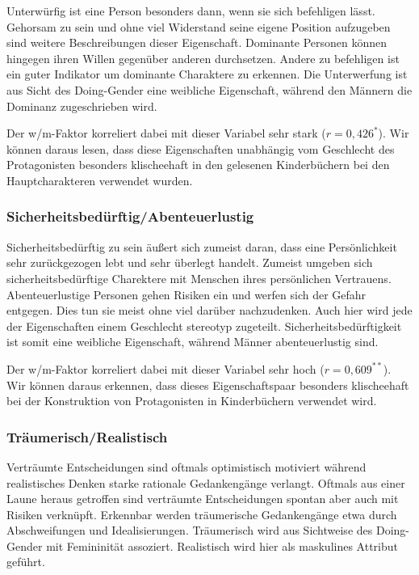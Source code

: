 Unterwürfig ist eine Person besonders dann, wenn sie sich befehligen
lässt. Gehorsam zu sein und ohne viel Widerstand seine eigene Position
aufzugeben sind weitere Beschreibungen dieser Eigenschaft. Dominante
Personen können hingegen ihren Willen gegenüber anderen durchsetzen.
Andere zu befehligen ist ein guter Indikator um dominante Charaktere zu
erkennen. Die Unterwerfung ist aus Sicht des Doing-Gender eine weibliche
Eigenschaft, während den Männern die Dominanz zugeschrieben wird.

Der w/m-Faktor korreliert dabei mit dieser Variabel sehr stark
($r= 0{,}426^*$). Wir können daraus lesen, dass diese Eigenschaften
unabhängig vom Geschlecht des Protagonisten besonders klischeehaft in
den gelesenen Kinderbüchern bei den Hauptcharakteren verwendet wurden.

\subsubsection{Sicherheitsbedürftig/Abenteuerlustig}

Sicherheitsbedürftig zu sein äußert sich zumeist daran, dass eine
Persönlichkeit sehr zurückgezogen lebt und sehr überlegt handelt.
Zumeist umgeben sich sicherheitsbedürftige Charektere mit Menschen ihres
persönlichen Vertrauens. Abenteuerlustige Personen gehen Risiken ein und
werfen sich der Gefahr entgegen. Dies tun sie meist ohne viel darüber
nachzudenken. Auch hier wird jede der Eigenschaften einem Geschlecht
stereotyp zugeteilt. Sicherheitsbedürftigkeit ist somit eine weibliche
Eigenschaft, während Männer abenteuerlustig sind.

Der w/m-Faktor korreliert dabei mit dieser Variabel sehr hoch
($r= 0{,}609^{**}$). Wir können daraus erkennen, dass dieses
Eigenschaftspaar besonders klischeehaft bei der Konstruktion von
Protagonisten in Kinderbüchern verwendet wird.

\subsubsection{Träumerisch/Realistisch}

Verträumte Entscheidungen sind oftmals optimistisch motiviert während
realistisches Denken starke rationale Gedankengänge verlangt. Oftmals
aus einer Laune heraus getroffen sind verträumte Entscheidungen spontan
aber auch mit Risiken verknüpft. Erkennbar werden träumerische
Gedankengänge etwa durch Abschweifungen und Idealisierungen. Träumerisch
wird aus Sichtweise des Doing-Gender mit Femininität assoziert.
Realistisch wird hier als maskulines Attribut geführt.

